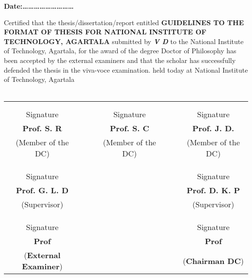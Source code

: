 \begin{flushright}
{\bf Date:\ldots\ldots\ldots\ldots\ldots\ldots\ldots\ldots\ldots}  
\end{flushright}
Certified that the thesis/dissertation/report entitled \textbf{ GUIDELINES TO THE FORMAT OF THESIS FOR NATIONAL INSTITUTE OF TECHNOLOGY, AGARTALA} submitted by \emph
{\textbf{V D}} to the National Institute of Technology, Agartala, for the 
award of the degree Doctor of Philosophy has been accepted by the 
external examiners and that the scholar has successfully defended the 
thesis in the viva-voce examination. held today at National Institute of Technology, Agartala \\ \\
\vspace{4pt}
\begin{centering}
\begin{tabular}{c c c c c c c}
{}&{}&{}&{}&{}&{}&{}\\
{}&{}&{}&{}&{}&{}&{}\\
{Signature}&{}&{}&{Signature}&{}&{}&{Signature}\\
{\textbf{Prof. S. R}}& {}&{}&{\textbf{Prof. S. C}}&{}&{}&{\textbf{Prof. J. D.}}\\ 
{(Member of the DC)}&{}&{}&{(Member of the DC)}&{}&{}&{(Member of the DC)}\\
{}&{}&{}&{}&{}&{}&{}\\
{}&{}&{}&{}&{}&{}&{}\\
{}&{}&{}&{}&{}&{}&{}\\
{Signature}&{}&{}&{}&{}&{}&{Signature}\\
{\textbf{Prof. G. L. D}}&{}&{}&{}&{}&{}&{\textbf{Prof. D. K. P}}\\
{(Supervisor)}&{}&{}&{}&{}&{}&{(Supervisor)}\\
{}&{}&{}&{}&{}&{}&{}\\
{}&{}&{}&{}&{}&{}&{}\\
{}&{}&{}&{}&{}&{}&{}\\
{Signature}&{}&{}&{}&{}&{}&{Signature}\\
{\textbf{Prof}}&{}&{}&{}&{}&{}&{\textbf{Prof}}\\
{(\textbf{External Examiner})}&{}&{}&{}&{}&{}&{(\textbf{Chairman DC})}\\
\end{tabular}
\end{centering}





